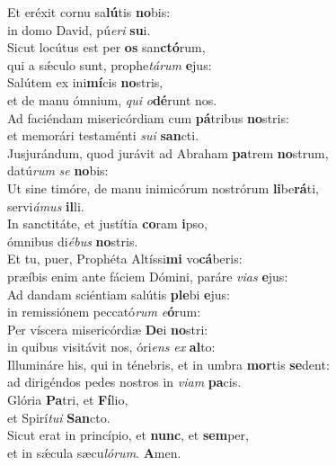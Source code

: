 \evenverse Et eréxit cornu sa\textbf{lú}tis \textbf{no}bis:~\*\\
\evenverse in domo David, pú\textit{e}\textit{ri} \textbf{su}i.\\
\oddverse Sicut locútus est per \textbf{os} san\textbf{ctó}rum,~\*\\
\oddverse qui a sǽculo sunt, prophe\textit{tá}\textit{rum} \textbf{e}jus:\\
\evenverse Salútem ex ini\textbf{mí}cis \textbf{no}stris,~\*\\
\evenverse et de manu ómnium, \textit{qui} \textit{o}\textbf{dé}runt nos.\\
\oddverse Ad faciéndam misericórdiam cum \textbf{pá}tribus \textbf{no}stris:~\*\\
\oddverse et memorári testaménti \textit{su}\textit{i} \textbf{san}cti.\\
\evenverse Jusjurándum, quod jurávit ad Abraham \textbf{pa}trem \textbf{no}strum,~\*\\
\evenverse datú\textit{rum} \textit{se} \textbf{no}bis:\\
\oddverse Ut sine timóre, de manu inimicórum nostrórum \textbf{li}be\textbf{rá}ti,~\*\\
\oddverse servi\textit{á}\textit{mus} \textbf{il}li.\\
\evenverse In sanctitáte, et justítia \textbf{co}ram \textbf{i}pso,~\*\\
\evenverse ómnibus di\textit{é}\textit{bus} \textbf{no}stris.\\
\oddverse Et tu, puer, Prophéta Altíssi\textbf{mi} vo\textbf{cá}beris:~\*\\
\oddverse præíbis enim ante fáciem Dómini, paráre \textit{vi}\textit{as} \textbf{e}jus:\\
\evenverse Ad dandam sciéntiam salútis \textbf{ple}bi \textbf{e}jus:~\*\\
\evenverse in remissiónem peccató\textit{rum} \textit{e}\textbf{ó}rum:\\
\oddverse Per víscera misericórdiæ \textbf{De}i \textbf{no}stri:~\*\\
\oddverse in quibus visitávit nos, óri\textit{ens} \textit{ex} \textbf{al}to:\\
\evenverse Illumináre his, qui in ténebris, et in umbra \textbf{mor}tis \textbf{se}dent:~\*\\
\evenverse ad dirigéndos pedes nostros in \textit{vi}\textit{am} \textbf{pa}cis.\\
\oddverse Glória \textbf{Pa}tri, et \textbf{Fí}lio,~\*\\
\oddverse et Spirí\textit{tu}\textit{i} \textbf{San}cto.\\
\evenverse Sicut erat in princípio, et \textbf{nunc}, et \textbf{sem}per,~\*\\
\evenverse et in sǽcula sæcu\textit{ló}\textit{rum}. \textbf{A}men.\\
